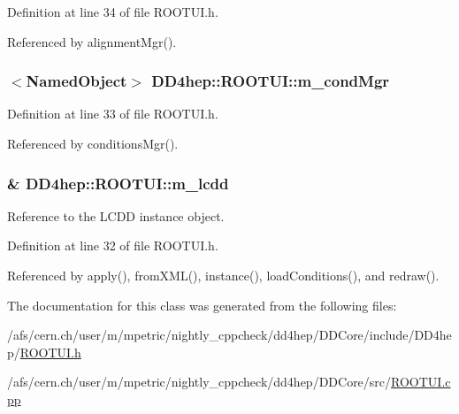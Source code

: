Definition at line 34 of file ROOTUI.h.

Referenced by alignmentMgr().\hypertarget{class_d_d4hep_1_1_r_o_o_t_u_i_aad76877df2fc04d079cf63b9898c123a}{
\subsubsection[{m\_\-condMgr}]{$<${\bf NamedObject}$>$ {\bf DD4hep::ROOTUI::m\_\-condMgr}}}
\label{class_d_d4hep_1_1_r_o_o_t_u_i_aad76877df2fc04d079cf63b9898c123a}


Definition at line 33 of file ROOTUI.h.

Referenced by conditionsMgr().\hypertarget{class_d_d4hep_1_1_r_o_o_t_u_i_a5ee50c37b731dbace8e02609727c937d}{
\subsubsection[{m\_\-lcdd}]{\& {\bf DD4hep::ROOTUI::m\_\-lcdd}}}
\label{class_d_d4hep_1_1_r_o_o_t_u_i_a5ee50c37b731dbace8e02609727c937d}


Reference to the LCDD instance object. 

Definition at line 32 of file ROOTUI.h.

Referenced by apply(), fromXML(), instance(), loadConditions(), and redraw().

The documentation for this class was generated from the following files:\begin{DoxyCompactItemize}
\item 
/afs/cern.ch/user/m/mpetric/nightly\_\-cppcheck/dd4hep/DDCore/include/DD4hep/\hyperlink{_r_o_o_t_u_i_8h}{ROOTUI.h}\item 
/afs/cern.ch/user/m/mpetric/nightly\_\-cppcheck/dd4hep/DDCore/src/\hyperlink{_r_o_o_t_u_i_8cpp}{ROOTUI.cpp}\end{DoxyCompactItemize}
